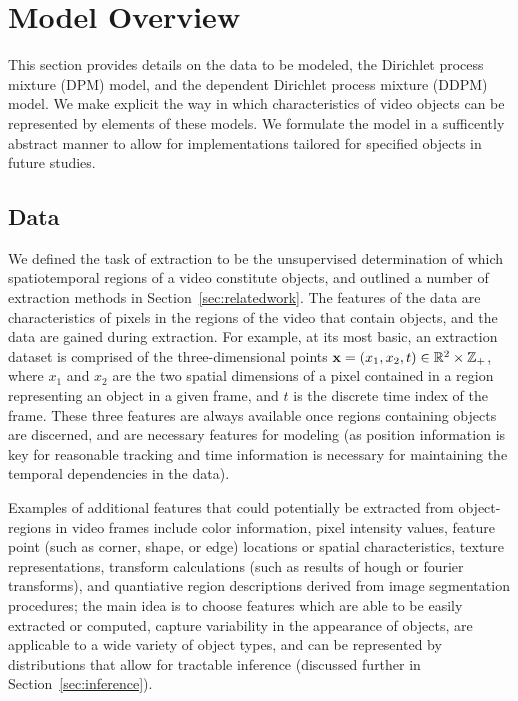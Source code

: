 \documentclass[smallcondensed, final]{svjour3}
\begin{document}
\section{Model Overview}
\label{sec:modeloverview}
%
This section provides details on the data to be modeled, the Dirichlet process mixture (DPM) model, and the dependent Dirichlet process mixture (DDPM) model. We make explicit the way in which characteristics of video objects can be represented by elements of these models. We formulate the model in a sufficently abstract manner to allow for implementations tailored for specified objects in future studies.




\subsection{Data}
\label{sec:data}
%
We defined the task of extraction to be the unsupervised determination of which spatiotemporal regions of a video constitute objects, and outlined a number of extraction methods in Section~\ref{sec:relatedwork}. The features of the data are characteristics of pixels in the regions of the video that contain objects, and the data are gained during extraction. For example, at its most basic, an extraction dataset is comprised of the three-dimensional points $\bold{x} = ( x_{1}, x_{2}, t ) \in \mathbb{R}^{2} \times \mathbb{Z}_{+}$, where $x_{1}$ and $x_{2}$ are the two spatial dimensions of a pixel contained in a region representing an object in a given frame, and $t$ is the discrete time index of the frame. These three features are always available once regions containing objects are discerned, and are necessary features for modeling (as position information is key for reasonable tracking and time information is necessary for maintaining the temporal dependencies in the data).

Examples of additional features that could potentially be extracted from object-regions in video frames include color information, pixel intensity values, feature point (such as corner, shape, or edge) locations or spatial characteristics, texture representations, transform calculations (such as results of hough or fourier transforms), and quantiative region descriptions derived from image segmentation procedures; the main idea is to choose features which are able to be easily extracted or computed, capture variability in the appearance of objects, are applicable to a wide variety of object types, and can be represented by distributions that allow for tractable inference (discussed further in Section~\ref{sec:inference}).
\end{document}
